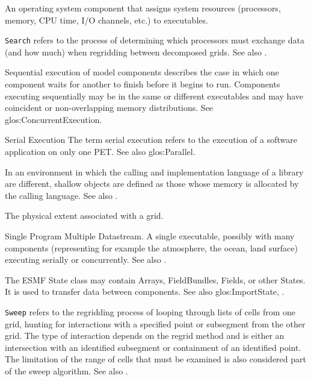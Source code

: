 \begin{description}
\label{glos:Scheduler} 
\item[Scheduler] 
  An operating system component 
  that assigns system resources (processors, memory, CPU time, 
  I/O channels, etc.) to executables.

\label{glos:Search} 
\item[Search]
  {\tt Search} refers to the process of determining which processors must
  exchange data (and how much) when regridding between decomposed grids.
  See also .

\label{glos:SequentialExecution}
\item[Sequential execution] 
  Sequential execution of model components describes the case in which 
  one component waits for another to finish before it begins
  to run.  Components executing sequentially may be in the same or 
  different executables and may have coincident or non-overlapping 
  memory distributions.  See 
  {glos:ConcurrentExecution}.

\label{glos:Serial}
\item{Serial Execution}
  The term serial execution refers to the execution of a software
  application on only one PET.  See also 
  {glos:Parallel}.

\label{glos:ShallowObjects} 
\item[Shallow object] 
  In an environment
  in which the calling and implementation language of a library are
  different, shallow objects are defined as those whose memory is 
  allocated by the calling language. 
  See also .

\label{glos:Span} 
\item[Span] 
  The physical extent associated with a grid.

\label{glos:SPMD} 
\item[SPMD] 
  Single Program Multiple Datastream. 
  A single executable, possibly with many components (representing 
  for example the atmosphere, the ocean, land surface) executing 
  serially or concurrently. See also . 

\label{glos:State} 
\item [State] 
  The ESMF State class may 
  contain Arrays, FieldBundles, Fields, or other States.  It is used to 
  transfer data between components.  See also 
  {glos:ImportState}, .

\label{glos:Sweep} 
\item[Sweep]
  {\tt Sweep} refers to the regridding process of looping through lists of cells
  from one grid, hunting for interactions with a specified point or subsegment
  from the other grid.  The type of interaction depends on the regrid method
  and is either an intersection with an identified subsegment or containment
  of an identified point.  The limitation of the range of cells that must be
  examined is also considered part of the sweep algorithm.
  See also .


\end{description}
